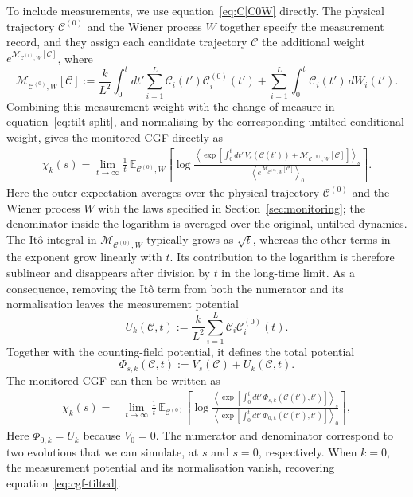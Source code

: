 \documentclass[11pt]{article}
\begin{document}
To include measurements, we use equation~\ref{eq:C|C0W} directly. The physical trajectory $\mathcal{C}^{(0)}$ and the Wiener process $W$ together specify the measurement record, and they assign each candidate trajectory $\mathcal{C}$ the additional weight $e^{\mathcal{M}_{\mathcal{C}^{(0)},W}[\mathcal{C}]}$, where
\[
    \mathcal{M}_{\mathcal{C}^{(0)},W}[\mathcal{C}]
    := \frac{k}{L^2}\int_0^t dt'\sum_{i=1}^L
    \mathcal{C}_i(t')\mathcal{C}^{(0)}_i(t')
    +\sum_{i=1}^L\int_0^t \mathcal{C}_i(t')\,dW_i(t').
\]
Combining this measurement weight with the change of measure in equation~\ref{eq:tilt-split}, and normalising by the corresponding untilted conditional weight, gives the monitored CGF directly as
\begin{equation}
\begin{split}
    \chi_k(s) = \lim_{t\to\infty}\frac{1}{t}\,
    \mathbb{E}_{\mathcal{C}^{(0)},W}\!\left[
    \log
    \frac{
    \left\langle \exp\!\left[
        \displaystyle\int_0^t dt'\,
        V_s(\mathcal{C}(t'))
        +\mathcal{M}_{\mathcal{C}^{(0)},W}[\mathcal{C}]
    \right]\right\rangle_s
    }{
    \left\langle
        e^{\mathcal{M}_{\mathcal{C}^{(0)},W}[\mathcal{C}]}
    \right\rangle_0
    }
    \right].
\end{split}
    \label{eq:cgf-monitored}
\end{equation}
Here the outer expectation averages over the physical trajectory $\mathcal{C}^{(0)}$ and the Wiener process $W$ with the laws specified in Section~\ref{sec:monitoring}; the denominator inside the logarithm is averaged over the original, untilted dynamics. The It\^o integral in $\mathcal{M}_{\mathcal{C}^{(0)},W}$ typically grows as $\sqrt{t}$, whereas the other terms in the exponent grow linearly with $t$. Its contribution to the logarithm is therefore sublinear and disappears after division by $t$ in the long-time limit.
As a consequence, removing the It\^o term from both the numerator and its normalisation leaves the measurement potential
\[
    U_k(\mathcal{C},t)
    :=\frac{k}{L^2}\sum_{i=1}^L
    \mathcal{C}_i\mathcal{C}^{(0)}_i(t).
\]
Together with the counting-field potential, it defines the total potential
\[
    \Phi_{s,k}(\mathcal{C},t)
    :=V_s(\mathcal{C})+U_k(\mathcal{C},t).
\]
The monitored CGF can then be written as
\begin{equation}
\begin{split}
    \chi_k(s)
    ={}& \lim_{t\to\infty}\frac{1}{t}\,
    \mathbb{E}_{\mathcal{C}^{(0)}}\!\left[
    \log
    \frac{
    \left\langle\exp\left[\int_0^t dt'\,
        \Phi_{s,k}\!\left(\mathcal{C}(t'),t'\right)
    \right]\right\rangle_s
    }{
    \left\langle\exp\left[\int_0^t dt'\,
        \Phi_{0,k}\!\left(\mathcal{C}(t'),t'\right)
    \right]\right\rangle_0
    }
    \right],
\end{split}
    \label{eq:cgf-simulated-1}
\end{equation}
Here $\Phi_{0,k}=U_k$ because $V_0=0$. The numerator and denominator correspond to two evolutions that we can simulate, at $s$ and $s=0$, respectively. When $k=0$, the measurement potential and its normalisation vanish, recovering equation~\ref{eq:cgf-tilted}.
\end{document}

